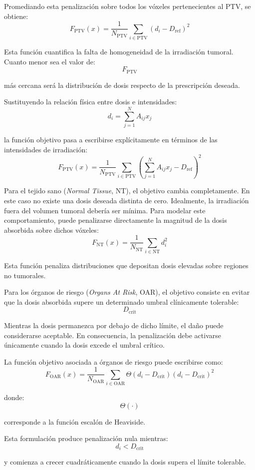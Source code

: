 Promediando esta penalización sobre todos los vóxeles pertenecientes al PTV, se obtiene:
\[
F_{\text{PTV}}(x)
=
\frac{1}{N_{\text{PTV}}}
\sum_{i\in \text{PTV}}
(d_i-D_{\text{ref}})^2
\]

Esta función cuantifica la falta de homogeneidad de la irradiación tumoral. Cuanto menor sea el valor de:
\[
F_{\text{PTV}}
\]

más cercana será la distribución de dosis respecto de la prescripción deseada.

Sustituyendo la relación física entre dosis e intensidades:
\[
d_i=
\sum_{j=1}^{N}
A_{ij}x_j
\]

la función objetivo pasa a escribirse explícitamente en términos de las intensidades de irradiación:
\[
F_{\text{PTV}}(x)
=
\frac{1}{N_{\text{PTV}}}
\sum_{i\in \text{PTV}}
\left(
\sum_{j=1}^{N}
A_{ij}x_j
-
D_{\text{ref}}
\right)^2
\]

Para el tejido sano (\textit{Normal Tissue}, NT), el objetivo cambia completamente. En este caso no existe una dosis deseada distinta de cero. Idealmente, la irradiación fuera del volumen tumoral debería ser mínima. Para modelar este comportamiento, puede penalizarse directamente la magnitud de la dosis absorbida sobre dichos vóxeles:
\[
F_{\text{NT}}(x)
=
\frac{1}{N_{\text{NT}}}
\sum_{i\in \text{NT}}
d_i^2
\]

Esta función penaliza distribuciones que depositan dosis elevadas sobre regiones no tumorales.

Para los órganos de riesgo (\textit{Organs At Risk}, OAR), el objetivo consiste en evitar que la dosis absorbida supere un determinado umbral clínicamente tolerable:
\[
D_{\text{crit}}
\]

Mientras la dosis permanezca por debajo de dicho límite, el daño puede considerarse aceptable. En consecuencia, la penalización debe activarse únicamente cuando la dosis excede el umbral crítico.

La función objetivo asociada a órganos de riesgo puede escribirse como:
\[
F_{\text{OAR}}(x)
=
\frac{1}{N_{\text{OAR}}}
\sum_{i\in \text{OAR}}
\Theta(d_i-D_{\text{crit}})
(d_i-D_{\text{crit}})^2
\]

donde:
\[
\Theta(\cdot)
\]

corresponde a la función escalón de Heaviside.

Esta formulación produce penalización nula mientras:
\[
d_i<D_{\text{crit}}
\]

y comienza a crecer cuadráticamente cuando la dosis supera el límite tolerable.

